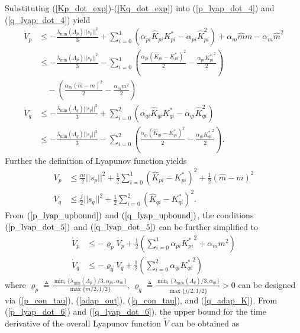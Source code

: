 Substituting (\ref{Kp_dot_exp})-(\ref{Kq_dot_exp}) into (\ref{p_lyap_dot_4}) and (\ref{q_lyap_dot_4}) yield
\begin{align}
    \dot{V}_p & \leq - \frac{\lambda_{\min}(\Lambda_p)||s_p||^2}{3}  + \sum \limits_{i=0}^{1} (\alpha_{pi} \hat{K}_{pi} K_{pi}^* - \alpha_{pi} \hat{K}_{pi}^2) + \alpha_{m} \hat{m} m - \alpha_{m} \hat{m}^2 \nonumber \\
    & \leq - \frac{\lambda_{\min}(\Lambda_p)||s_p||^2}{3}  - \sum \limits_{i=0}^{1} \left(\frac{\alpha_{pi}(\hat{K}_{pi} -  K_{pi}^*)^2}{2} - \frac{\alpha_{pi} {K_{pi}^*}^2}{2} \right)  \nonumber \\
    & \quad - \left(\frac{ \alpha_{m} (\hat{m} - m)^2}{2} - \frac{\alpha_{m} {m}^2}{2} \right) \label{p_lyap_dot_5} \\
    \dot{V}_q & \leq - \frac{\lambda_{\min}(\Lambda_q)||s_q||^2}{3} + \sum \limits_{i=0}^{2} (\alpha_{qi} \hat{K}_{qi} K_{qi}^* - \alpha_{qi} \hat{K}_{qi}^2) \nonumber \\
    & \leq - \frac{\lambda_{\min}(\Lambda_q)||s_q||^2}{3}  - \sum \limits_{i=0}^{2} \left(\frac{\alpha_{qi}(\hat{K}_{qi} -  K_{qi}^*)^2}{2} - \frac{\alpha_{qi} {K_{qi}^*}^2}{2} \right). \label{q_lyap_dot_5}
\end{align}
Further the definition of Lyapunov function yields
\begin{align}
    V_p & \leq \frac{{m}}{2} ||s_p||^2 + \frac{1}{2} \sum \limits_{i=0}^{1} (\hat{K}_{pi} - K_{pi}^*)^2 + \frac{1}{2} (\hat{m} - m)^2 \label{p_lyap_upbound} \\
    V_q & \leq \frac{\overline{j}}{2} ||s_q||^2 + \frac{1}{2} \sum \limits_{i=0}^{2} (\hat{K}_{qi} - K_{qi}^*)^2. \label{q_lyap_upbound}
\end{align}
From $(\ref{p_lyap_upbound})$ and $(\ref{q_lyap_upbound})$, the conditions $(\ref{p_lyap_dot_5})$ and $(\ref{q_lyap_dot_5})$ can be further simplified to
\begin{align}
    \dot{V}_p & \leq -\varrho_p V_p + \frac{1}{2}\left( \sum \limits_{i=0}^{1} \alpha_{pi} {K^*_{pi}}^2 + \alpha_{m} {m}^2  \right) \label{p_lyap_dot_6} \\
    \dot{V}_q & \leq -\varrho_q V_q + \frac{1}{2}\left( \sum \limits_{i=0}^{2} \alpha_{qi} {K^*_{qi}}^2 \right) \label{q_lyap_dot_6}
\end{align}
where $\varrho_p \triangleq  \frac{\min_i\{ \lambda_{\min}(\Lambda_p)/3, \alpha_{pi}, \alpha_{m} \}}{\max \{ {m}/2, 1/2 \}}$, $\varrho_q \triangleq  \frac{\min_i \lbrace \lambda_{min}(\Lambda_q)/3,  \alpha_{qi} \rbrace }{\max \lbrace \overline{j}/2, 1/2 \rbrace} > 0$ can be designed via (\ref{p_con_tau}), (\ref{adap_out}), (\ref{q_con_tau}), and (\ref{q_adap_K}). From (\ref{p_lyap_dot_6}) and (\ref{q_lyap_dot_6}), the upper bound for the time derivative of the overall Lyapunov function $\dot{V}$ can be obtained as
